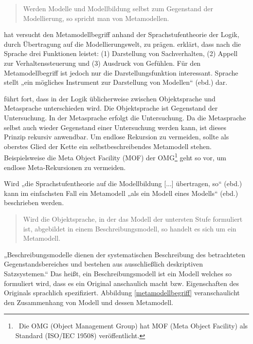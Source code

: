 \begin{quote}
 Werden Modelle und Modellbildung selbst zum Gegenstand der Modellierung, so spricht man von Metamodellen. \citep[S.~1]{Strahringer}
\end{quote}
 
\citep{Strahringer} hat versucht den Metamodellbegriff anhand der Sprachstufentheorie der Logik, durch Übertragung auf die Modellierungswelt, zu prägen. \citep[S.~1]{Strahringer} erklärt, dass nach \citep{Buehler} die Sprache drei Funktionen leistet: (1) Darstellung von Sachverhalten, (2) Appell zur Verhaltenssteuerung und (3) Ausdruck von Gefühlen. Für den Metamodellbegriff ist jedoch nur die Darstellungsfunktion interessant. Sprache stellt „ein mögliches Instrument zur Darstellung von Modellen“ (ebd.) dar.

 
\citep[S.~1]{Strahringer} führt fort, dass in der Logik üblicherweise zwischen Objektsprache und Metasprache unterschieden wird. Die Objektsprache ist Gegenstand der Untersuchung. In der Metasprache erfolgt die Untersuchung. Da die Metasprache selbst auch wieder Gegenstand einer Untersuchung werden kann, ist dieses Prinzip rekursiv anwendbar. Um endlose Rekursion zu vermeiden, sollte als oberstes Glied der Kette ein selbstbeschreibendes Metamodell stehen. Beispielsweise die Meta Object Facility (MOF) der OMG\footnote{~Die OMG (Object Management Group) hat MOF (Meta Object Facility) als Standard (ISO/IEC 19508) veröffentlicht. } geht so vor, um endlose Meta-Rekursionen zu vermeiden.

 
Wird „die Sprachstufentheorie auf die Modellbildung [...] übertragen, so“ (ebd.) kann im einfachsten Fall ein Metamodell „als ein Modell eines Modells“ (ebd.) beschrieben werden.

 
\begin{quote}
 Wird die Objektsprache, in der das Modell der untersten Stufe formuliert ist, abgebildet in einem Beschreibungsmodell, so handelt es sich um ein Metamodell. \citep[S.~3]{Strahringer}
\end{quote}
 
„Beschreibungsmodelle dienen der systematischen Beschreibung des betrachteten Gegenstandsbereiches und bestehen aus ausschließlich deskriptiven Satzsystemen.“ Das heißt, ein Beschreibungsmodell ist ein Modell welches so formuliert wird, dass es ein Original anschaulich macht bzw. Eigenschaften des Originals sprachlich spezifiziert. Abbildung \ref{metamodellbegriff} veranschaulicht den Zusammenhang von Modell und dessen Metamodell.


